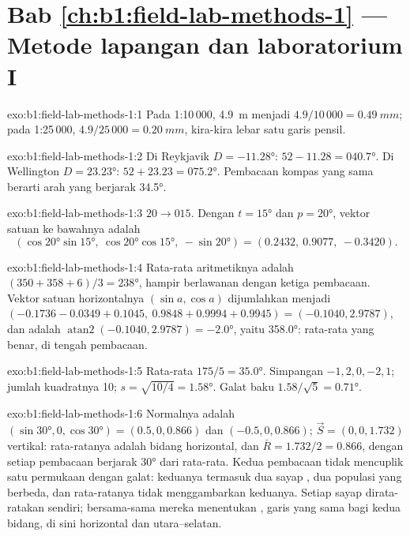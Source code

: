 \section*{Bab \ref{ch:b1:field-lab-methods-1} --- Metode lapangan dan laboratorium I}

\begin{solution}{exo:b1:field-lab-methods-1:1}
Pada 1:10\,000, \qty{4.9}{m} menjadi $4.9/10\,000 = \qty{0.49}{mm}$; pada 1:25\,000, $4.9/25\,000 = \qty{0.20}{mm}$, kira-kira lebar satu garis pensil.
\end{solution}

\begin{solution}{exo:b1:field-lab-methods-1:2}
Di Reykjavik $D = \ang{-11.28}$: $52 - 11.28 = \ang{040.7}$. Di Wellington
$D = \ang{+23.23}$: $52 + 23.23 = \ang{075.2}$. Pembacaan kompas yang sama berarti arah yang berjarak \ang{34.5}.
\end{solution}

\begin{solution}{exo:b1:field-lab-methods-1:3}
$20\to015$. Dengan $t = \ang{15}$ dan $p = \ang{20}$, vektor satuan ke bawahnya adalah
\[
  (\cos\ang{20}\sin\ang{15},\ \cos\ang{20}\cos\ang{15},\ -\sin\ang{20}) =
  (0.2432,\ 0.9077,\ -0.3420).
\]
\end{solution}

\begin{solution}{exo:b1:field-lab-methods-1:4}
Rata-rata aritmetiknya adalah $(350 + 358 + 6)/3 = \ang{238}$, hampir berlawanan dengan ketiga pembacaan. Vektor satuan horizontalnya $(\sin a, \cos a)$ dijumlahkan menjadi $(-0.1736 - 0.0349 + 0.1045,\ 0.9848 + 0.9994 + 0.9945) = (-0.1040, 2.9787)$, dan  adalah $\operatorname{atan2}(-0.1040, 2.9787) = \ang{-2.0}$, yaitu \ang{358.0}: rata-rata yang benar, di tengah pembacaan.
\end{solution}

\begin{solution}{exo:b1:field-lab-methods-1:5}
Rata-rata $175/5 = \ang{35.0}$. Simpangan $-1, 2, 0, -2, 1$; jumlah kuadratnya 10;
$s = \sqrt{10/4} = \ang{1.58}$. Galat baku $1.58/\sqrt5 = \ang{0.71}$.
\end{solution}

\begin{solution}{exo:b1:field-lab-methods-1:6}
Normalnya adalah $(\sin\ang{30}, 0, \cos\ang{30}) = (0.5, 0, 0.866)$ dan
$(-0.5, 0, 0.866)$; $\vec S = (0, 0, 1.732)$ vertikal: rata-ratanya adalah bidang horizontal, dan $\bar R = 1.732/2 = 0.866$, dengan setiap pembacaan berjarak \ang{30} dari rata-rata. Kedua pembacaan tidak mencuplik satu permukaan dengan galat: keduanya termasuk dua sayap , dua populasi yang berbeda, dan rata-ratanya tidak menggambarkan keduanya. Setiap sayap dirata-ratakan sendiri; bersama-sama mereka menentukan , garis yang sama bagi kedua bidang, di sini horizontal dan utara--selatan.
\end{solution}

